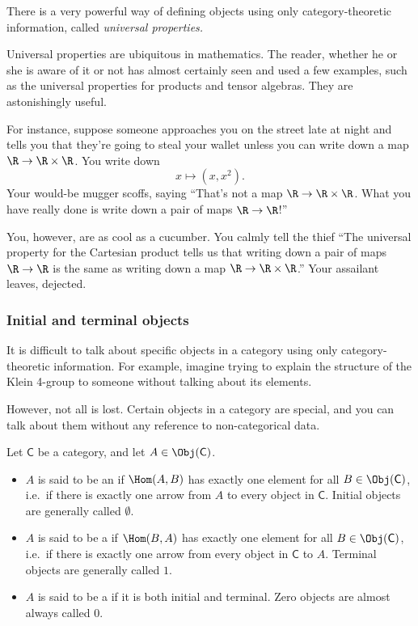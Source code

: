 \documentclass[notes.tex]{subfiles}
\begin{document}
There is a very powerful way of defining objects using only category-theoretic information, called \emph{universal properties.}

Universal properties are ubiquitous in mathematics. The reader, whether he or she is aware of it or not has almost certainly seen and used a few examples, such as the universal properties for products and tensor algebras. They are astonishingly useful.

For instance, suppose someone approaches you on the street late at night and tells you that they're going to steal your wallet unless you can write down a map $\R \to \R \times \R$. You write down
\begin{equation*}
  x \mapsto (x, x^{2}).
\end{equation*}
Your would-be mugger scoffs, saying ``That's not a map $\R \to \R \times \R$. What you have really done is write down a pair of maps $\R \to \R$!''

You, however, are as cool as a cucumber. You calmly tell the thief ``The universal property for the Cartesian product tells us that writing down a pair of maps $\R \to \R$ is the same as writing down a map $\R \to \R \times \R$.'' Your assailant leaves, dejected.


\subsubsection{Initial and terminal objects}

It is difficult to talk about specific objects in a category using only category-theoretic information. For example, imagine trying to explain the structure of the Klein 4-group to someone without talking about its elements.

However, not all is lost. Certain objects in a category are special, and you can talk about them without any reference to non-categorical data.

\begin{definition}
  \label{def:initialfinalzeroobject}
  Let $\mathsf{C}$ be a category, and let $A \in \Obj(\mathsf{C})$.
  \begin{itemize}
    \item $A$ is said to be an  if $\Hom(A,B)$ has exactly one element for all $B\in \Obj(\mathsf{C})$, i.e.\ if there is exactly one arrow from $A$ to every object in $\mathsf{C}$. Initial objects are generally called $\emptyset$.

    \item $A$ is said to be a  if $\Hom(B,A)$ has exactly one element for all $B\in \Obj(\mathsf{C})$, i.e.\ if there is exactly one arrow from every object in $\mathsf{C}$ to $A$. Terminal objects are generally called $1$.

    \item $A$ is said to be a  if it is both initial and terminal. Zero objects are almost always called $0$.
  \end{itemize}
\end{definition}
\end{document}
